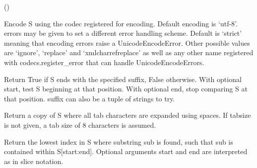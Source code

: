 \documentclass[letterpaper,10pt,english]{sphinxmanual}
\begin{document}
\begin{fulllineitems}
\begin{fulllineitems}
()

\end{fulllineitems}


\begin{fulllineitems}
\label{api_reference:textblob_de.blob.Word.encode}
Encode S using the codec registered for encoding. Default encoding
is `utf-8'. errors may be given to set a different error
handling scheme. Default is `strict' meaning that encoding errors raise
a UnicodeEncodeError. Other possible values are `ignore', `replace' and
`xmlcharrefreplace' as well as any other name registered with
codecs.register\_error that can handle UnicodeEncodeErrors.

\end{fulllineitems}


\begin{fulllineitems}
\label{api_reference:textblob_de.blob.Word.endswith}
Return True if S ends with the specified suffix, False otherwise.
With optional start, test S beginning at that position.
With optional end, stop comparing S at that position.
suffix can also be a tuple of strings to try.

\end{fulllineitems}


\begin{fulllineitems}
\label{api_reference:textblob_de.blob.Word.expandtabs}
Return a copy of S where all tab characters are expanded using spaces.
If tabsize is not given, a tab size of 8 characters is assumed.

\end{fulllineitems}


\begin{fulllineitems}
\label{api_reference:textblob_de.blob.Word.find}
Return the lowest index in S where substring sub is found,
such that sub is contained within S{[}start:end{]}.  Optional
arguments start and end are interpreted as in slice notation.


\end{fulllineitems}
\end{fulllineitems}
\end{document}
